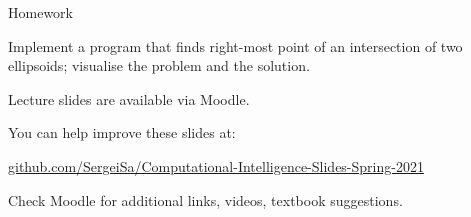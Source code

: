 \documentclass{beamer}
\begin{document}
\begin{frame}{Homework}
\begin{flushleft}

Implement a program that finds right-most point of an intersection of two ellipsoids; visualise the problem and the solution.

\end{flushleft}
\end{frame}




\begin{frame}
\centerline{Lecture slides are available via Moodle.}
\bigskip
\centerline{You can help improve these slides at:}
\centerline{
\textcolor{blue}{\href{https://github.com/SergeiSa/Computational-Intelligence-Slides-Spring-2021}{github.com/SergeiSa/Computational-Intelligence-Slides-Spring-2021}}
}
\bigskip

\textcolor{black}{}
\bigskip

\centerline{Check Moodle for additional links, videos, textbook suggestions.}
\end{frame}
\end{document}
